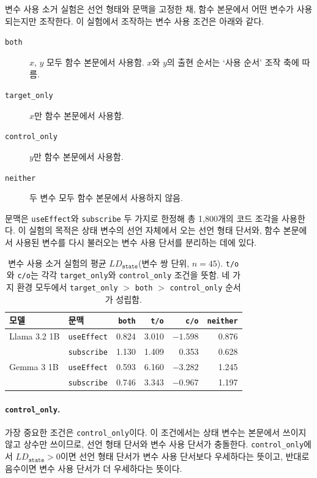 \documentclass[11pt]{article}
\begin{document}
변수 사용 소거 실험은 선언 형태와 문맥을 고정한 채, 함수 본문에서 어떤 변수가 사용되는지만 조작한다.
이 실험에서 조작하는 변수 사용 조건은 아래와 같다.

\begin{description}
\item[\texttt{both}] $x$, $y$ 모두 함수 본문에서 사용함. $x$와 $y$의 출현 순서는 `사용 순서' 조작 축에 따름.
\item[\texttt{target\_only}] $x$만 함수 본문에서 사용함.
\item[\texttt{control\_only}] $y$만 함수 본문에서 사용함.
\item[\texttt{neither}] 두 변수 모두 함수 본문에서 사용하지 않음.
\end{description}

문맥은 \texttt{useEffect}와 \texttt{subscribe} 두 가지로 한정해 총 1,800개의 코드 조각을 사용한다.
이 실험의 목적은 상태 변수의 선언 자체에서 오는 선언 형태 단서와, 함수 본문에서 사용된 변수를 다시 불러오는 변수 사용 단서를 분리하는 데에 있다.

\begin{table}[t]
\centering
\small
\begin{supertabular}{llrrrr}
  \toprule
  \textbf{모델} & \textbf{문맥} & \textbf{\texttt{both}} & \textbf{\texttt{t/o}} & \textbf{\texttt{c/o}} & \textbf{\texttt{neither}} \\
  \midrule
  Llama 3.2 1B & \texttt{useEffect} & 0.824 & 3.010 & $-1.598$ & 0.876 \\
  & \texttt{subscribe} & 1.130 & 1.409 & 0.353 & 0.628 \\
  \midrule
  Gemma 3 1B & \texttt{useEffect} & 0.593 & 6.160 & $-3.282$ & 1.245 \\
  & \texttt{subscribe} & 0.746 & 3.343 & $-0.967$ & 1.197 \\
  \bottomrule
\end{supertabular}
\caption{변수 사용 소거 실험의 평균 $LD_{\texttt{state}}$(변수 쌍 단위, $n=45$). \texttt{t/o}와 \texttt{c/o}는 각각 \texttt{target\_only}와 \texttt{control\_only} 조건을 뜻함. 네 가지 환경 모두에서 \texttt{target\_only} $>$ \texttt{both} $>$ \texttt{control\_only} 순서가 성립함.}
\label{tab:results-bodyuse}
\end{table}

\paragraph{\texttt{control\_only}.}
가장 중요한 조건은 \texttt{control\_only}이다.
이 조건에서는 상태 변수는 본문에서 쓰이지 않고 상수만 쓰이므로, 선언 형태 단서와 변수 사용 단서가 충돌한다.
\texttt{control\_only}에서 $LD_{\texttt{state}}>0$이면 선언 형태 단서가 변수 사용 단서보다 우세하다는 뜻이고, 반대로 음수이면 변수 사용 단서가 더 우세하다는 뜻이다.
\end{document}
